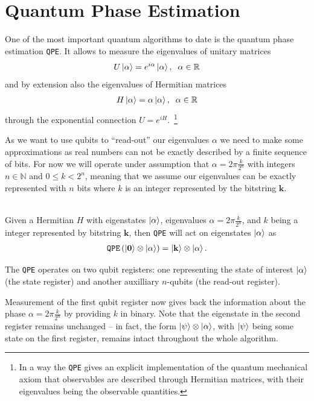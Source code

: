 \section{Quantum Phase Estimation}
One of the most important quantum algorithms to date is the quantum phase estimation \texttt{QPE}.
It allows to measure the eigenvalues of unitary matrices
\begin{align}
    U \ket{\alpha} = e^{i\alpha} \ket{\alpha}, \;\; \alpha \in \mathbb{R}
\end{align}
and by extension also the eigenvalues of Hermitian matrices
\begin{align}
       H \ket{\alpha} = \alpha \ket{\alpha}, \;\; \alpha \in \mathbb{R} 
\end{align}
through the exponential connection $U=e^{iH}$.~\footnote{In a way the \texttt{QPE} gives an explicit implementation of the quantum mechanical axiom that observables are described through Hermitian matrices, with their eigenvalues being the observable quantities.}

As we want to use qubits to ``read-out'' our eigenvalues $\alpha$ we need to make some approximations as real numbers can not be exactly described by a finite sequence of bits.
For now we will operate under assumption that $\alpha = 2\pi \frac{k}{2^n}$ with integers $n \in \mathbb{N}$ and $0 \leq k < 2^n$, meaning that we assume our eigenvalues can be exactly represented with $n$ bits where $k$ is an integer represented by the bitstring $\mathbf{k}$.

\begin{algo*}\phantom{...}\\
Given a Hermitian $H$ with eigenstates $\ket{\alpha}$, eigenvalues $\alpha = 2\pi \frac{k}{2^n}$, and $k$ being a integer represented by bitstring $\mathbf{k}$, then
\texttt{QPE} will act on eigenstates $\ket{\alpha}$ as
\begin{align}
    \texttt{QPE} \left(\ket{\mathbf{0}} \otimes \ket{\alpha}\right) = \ket{\mathbf{k}} \otimes \ket{\alpha}.
\end{align}
\end{algo*}
The \texttt{QPE} operates on two qubit registers: one representing the state of interest $\ket{\alpha}$ (the state register) and another auxilliary $n$-qubits (the read-out register).

Measurement of the first qubit register now gives back the information about the phase $\alpha = 2\pi \frac{k}{2^n}$ by providing $k$ in binary. Note that the eigenstate in the second register remains unchanged -- in fact, the form $\ket{\psi} \otimes \ket{\alpha}$, with $\ket{\psi}$ being some state on the first register, remains intact throughout the whole algorithm.

